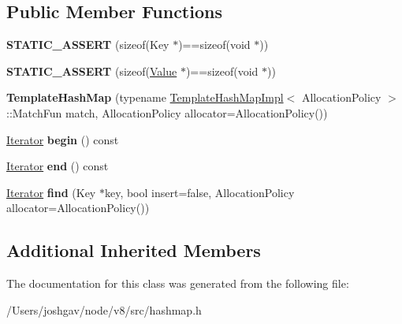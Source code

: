 \subsection*{Public Member Functions}
\begin{DoxyCompactItemize}
\item 
{\bfseries S\+T\+A\+T\+I\+C\+\_\+\+A\+S\+S\+E\+RT} (sizeof(Key $\ast$)==sizeof(void $\ast$))\hypertarget{classv8_1_1internal_1_1_template_hash_map_a16ea8f28ce419b2f52b29fb561a3becd}{}\label{classv8_1_1internal_1_1_template_hash_map_a16ea8f28ce419b2f52b29fb561a3becd}

\item 
{\bfseries S\+T\+A\+T\+I\+C\+\_\+\+A\+S\+S\+E\+RT} (sizeof(\hyperlink{classv8_1_1_value}{Value} $\ast$)==sizeof(void $\ast$))\hypertarget{classv8_1_1internal_1_1_template_hash_map_ad4553c341840131da132d9bba52e1b51}{}\label{classv8_1_1internal_1_1_template_hash_map_ad4553c341840131da132d9bba52e1b51}

\item 
{\bfseries Template\+Hash\+Map} (typename \hyperlink{classv8_1_1internal_1_1_template_hash_map_impl}{Template\+Hash\+Map\+Impl}$<$ Allocation\+Policy $>$\+::Match\+Fun match, Allocation\+Policy allocator=Allocation\+Policy())\hypertarget{classv8_1_1internal_1_1_template_hash_map_a2dbfcf5b0e072d3215b9a328902c4087}{}\label{classv8_1_1internal_1_1_template_hash_map_a2dbfcf5b0e072d3215b9a328902c4087}

\item 
\hyperlink{classv8_1_1internal_1_1_template_hash_map_1_1_iterator}{Iterator} {\bfseries begin} () const \hypertarget{classv8_1_1internal_1_1_template_hash_map_a3e45b5733032f44df627281abba5132a}{}\label{classv8_1_1internal_1_1_template_hash_map_a3e45b5733032f44df627281abba5132a}

\item 
\hyperlink{classv8_1_1internal_1_1_template_hash_map_1_1_iterator}{Iterator} {\bfseries end} () const \hypertarget{classv8_1_1internal_1_1_template_hash_map_ac0f9de87ab2031af02d8223a2b806537}{}\label{classv8_1_1internal_1_1_template_hash_map_ac0f9de87ab2031af02d8223a2b806537}

\item 
\hyperlink{classv8_1_1internal_1_1_template_hash_map_1_1_iterator}{Iterator} {\bfseries find} (Key $\ast$key, bool insert=false, Allocation\+Policy allocator=Allocation\+Policy())\hypertarget{classv8_1_1internal_1_1_template_hash_map_a7b6272cfd164aa89b907b9b025983851}{}\label{classv8_1_1internal_1_1_template_hash_map_a7b6272cfd164aa89b907b9b025983851}

\end{DoxyCompactItemize}
\subsection*{Additional Inherited Members}


The documentation for this class was generated from the following file\+:\begin{DoxyCompactItemize}
\item 
/\+Users/joshgav/node/v8/src/hashmap.\+h\end{DoxyCompactItemize}
